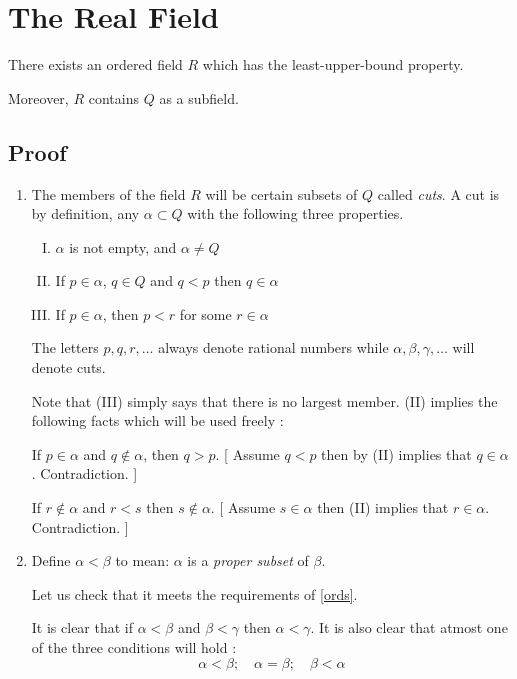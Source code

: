 \section{The Real Field}

\begin{thm}
    There exists an ordered field $R$ which has the least-upper-bound property.
    
    Moreover, $R$ contains $Q$ as a subfield.
\end{thm}

\subsection{Proof}
\begin{enumerate}[{\bf Step 1.}]
\item
The members of the field $R$ will be certain subsets of $Q$ called {\it cuts}.
A cut is by definition, any $\alpha \subset Q$ with the following three properties.

\begin{enumerate}[(I)]
    \item $\alpha$ is not empty, and $\alpha \neq Q$
    \item If $p \in \alpha$, $q \in Q$ and $q < p$ then $q \in \alpha$
    \item If $p \in \alpha$, then $p < r$ for some $r \in \alpha$
\end{enumerate}

The letters $p, q, r, \dots$ always denote rational numbers 
while $\alpha, \beta, \gamma, \dots$ will denote cuts.

Note that (III) simply says that there is no largest member.
(II) implies the following facts which will be used freely : 

If $p \in \alpha$ and $q \notin \alpha$, then $q > p$. 
[ Assume $q < p$ then by (II) implies that $q \in \alpha$. Contradiction. ]

If $r \notin \alpha$ and $r < s$ then $s \notin \alpha$.
[ Assume $s \in \alpha$ then (II) implies that $r \in \alpha$. Contradiction. ]

\item 
Define $\alpha < \beta$ to mean: $\alpha$ is a {\it proper subset} of $\beta$.

Let us check that it meets the requirements of \ref{ords}.

It is clear that if $\alpha < \beta$ and $\beta < \gamma$ then $\alpha < \gamma$.
It is also clear that atmost one of the three conditions will hold : 
$$ \alpha < \beta; \quad \alpha = \beta; \quad \beta < \alpha $$


\end{enumerate}
